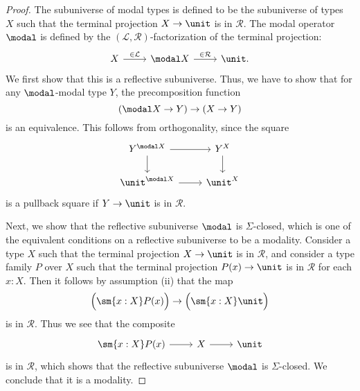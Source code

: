 \documentclass{msc}
\begin{document}
\begin{proof}
  The subuniverse of modal types is defined to be the subuniverse of types $X$ such that the terminal projection $X\to \unit$ is in $\mathcal{R}$. The modal operator $\modal$ is defined by the $(\mathcal{L},\mathcal{R})$-factorization of the terminal projection:
  \begin{equation*}
    \begin{tikzcd}
      X \arrow[r,"\in\mathcal{L}"] & \modal X \arrow[r,"\in\mathcal{R}"] & \unit.
    \end{tikzcd}
  \end{equation*}
  We first show that this is a reflective subuniverse. Thus, we have to show that for any $\modal$-modal type $Y$, the precomposition function
  \begin{equation*}
    (\modal X\to Y)\to (X\to Y)
  \end{equation*}
  is an equivalence. This follows from orthogonality, since the square
  \begin{equation*}
    \begin{tikzcd}
      Y^{\modal X} \arrow[r] \arrow[d] & Y^X \arrow[d] \\
      \unit^{\modal X} \arrow[r] & \unit^X
    \end{tikzcd}
  \end{equation*}
  is a pullback square if $Y\to\unit$ is in $\mathcal{R}$.

  Next, we show that the reflective subuniverse $\modal$ is $\Sigma$-closed, which is one of the equivalent conditions on a reflective subuniverse to be a modality. Consider a type $X$ such that the terminal projection $X\to\unit$ is in $\mathcal{R}$, and consider a type family $P$ over $X$ such that the terminal projection $P(x) \to \unit$ is in $\mathcal{R}$ for each $x:X$. Then it follows by assumption (ii) that the map
  \begin{equation*}
    \Big(\sm{x:X}P(x)\Big)\to\Big(\sm{x:X}\unit\Big)
  \end{equation*}
  is in $\mathcal{R}$. Thus we see that the composite
  \begin{equation*}
    \begin{tikzcd}
      \sm{x:X}P(x) \arrow[r] & X \arrow[r] & \unit
    \end{tikzcd}
  \end{equation*}
  is in $\mathcal{R}$, which shows that the reflective subuniverse $\modal$ is $\Sigma$-closed. We conclude that it is a modality.


\end{proof}
\end{document}
